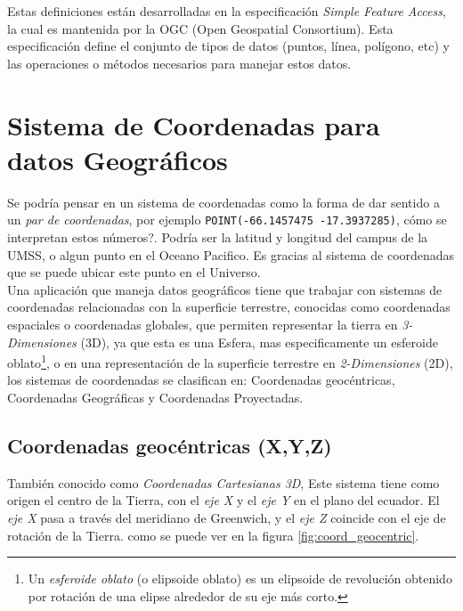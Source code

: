     Estas definiciones están desarrolladas en la especificación \emph{Simple Feature Access}, la cual es mantenida por la OGC (Open Geospatial Consortium). Esta especificación define el conjunto de tipos de datos (puntos, línea, polígono, etc) y las operaciones o métodos necesarios para manejar estos datos.


  \section{Sistema de Coordenadas para datos Geográficos} %
  \label{sec:sistema_de_coordenadas_para_datos_geograficos}
    Se podría pensar en un sistema de coordenadas como la forma de dar sentido a un \emph{par de coordenadas}, por ejemplo \verb|POINT(-66.1457475 -17.3937285)|, cómo se interpretan estos números?.
    Podría ser la latitud y longitud del campus de la UMSS, o algun punto en el Oceano Pacifico. Es gracias al sistema de coordenadas que se puede ubicar este punto en el Universo.\\


    Una aplicación que maneja datos geográficos tiene que trabajar con sistemas de coordenadas relacionadas con la superficie terrestre, conocidas como coordenadas espaciales o coordenadas globales, que permiten representar la tierra en \emph{3-Dimensiones} (3D), ya que esta es una Esfera, mas especificamente un esferoide oblato\footnote{Un \emph{esferoide oblato} (o elipsoide oblato) es un elipsoide de revolución obtenido por rotación de una elipse alrededor de su eje más corto.}, o en una representación de la superficie terrestre en \emph{2-Dimensiones} (2D), los sistemas de coordenadas se clasifican en: Coordenadas geocéntricas, Coordenadas Geográficas y Coordenadas Proyectadas.

    \subsection{Coordenadas geocéntricas (X,Y,Z)} %
      \label{sub:coordenadas_geocentricas}
        También conocido como \emph{Coordenadas Cartesianas 3D}, Este sistema tiene como origen el centro de la Tierra, con el \emph{eje X} y el \emph{eje Y} en el plano del ecuador. El \emph{eje X} pasa a través del meridiano de Greenwich, y el \emph{eje Z}  coincide con el eje de rotación de la Tierra. como se puede ver en la figura \ref{fig:coord_geocentric}.

